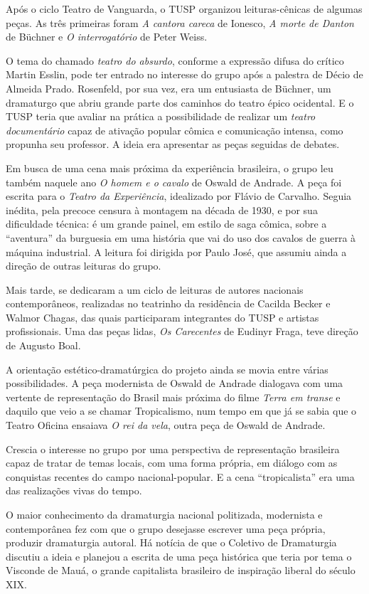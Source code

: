 Após o ciclo Teatro de Vanguarda, o TUSP organizou leituras-cênicas de
algumas peças. As três primeiras foram \textit{A cantora careca} de
Ionesco, \textit{A morte de Danton} de Büchner e \textit{O interrogatório} de
Peter Weiss.

O tema do chamado \textit{teatro do absurdo}, conforme a expressão difusa
do crítico Martin Esslin, pode ter entrado no interesse do grupo após a
palestra de Décio de Almeida Prado. Rosenfeld, por sua vez, era um
entusiasta de Büchner, um dramaturgo que abriu grande parte dos caminhos
do teatro épico ocidental. E o TUSP teria que avaliar na prática a
possibilidade de realizar um \textit{teatro documentário} capaz de ativação
popular cômica e comunicação intensa, como propunha seu professor. A
ideia era apresentar as peças seguidas de debates.

Em busca de uma cena mais próxima da experiência brasileira, o grupo leu
também naquele ano \textit{O homem e o cavalo} de Oswald de Andrade. A peça
foi escrita para o \textit{Teatro da Experiência}, idealizado por Flávio de
Carvalho. Seguia inédita, pela precoce censura à montagem na década de
1930, e por sua dificuldade técnica: é um grande painel, em estilo de
saga cômica, sobre a “aventura” da burguesia em uma história que vai do
uso dos cavalos de guerra à máquina industrial. A leitura foi dirigida
por Paulo José, que assumiu ainda a direção de outras leituras do grupo.

Mais tarde, se dedicaram a um ciclo de leituras de autores nacionais
contemporâneos, realizadas no teatrinho da residência de Cacilda Becker
e Walmor Chagas, das quais participaram integrantes do TUSP e artistas
profissionais. Uma das peças lidas, \textit{Os Carecentes} de Eudinyr
Fraga, teve direção de Augusto Boal.

A orientação estético-dramatúrgica do projeto ainda se movia entre
várias possibilidades. A peça modernista de Oswald de Andrade dialogava
com uma vertente de representação do Brasil mais próxima do filme
\textit{Terra em transe} e daquilo que veio a se chamar Tropicalismo, num
tempo em que já se sabia que o Teatro Oficina ensaiava \textit{O rei da
vela}, outra peça de Oswald de Andrade.

Crescia o interesse no grupo por uma perspectiva de representação
brasileira capaz de tratar de temas locais, com uma forma própria, em
diálogo com as conquistas recentes do campo nacional-popular. E a cena
“tropicalista” era uma das realizações vivas do tempo.

O maior conhecimento da dramaturgia nacional politizada, modernista e
contemporânea fez com que o grupo desejasse escrever uma peça própria,
produzir dramaturgia autoral. Há notícia de que o Coletivo de
Dramaturgia discutiu a ideia e planejou a escrita de uma peça histórica
que teria por tema o Visconde de Mauá, o grande capitalista brasileiro
de inspiração liberal do século XIX.

